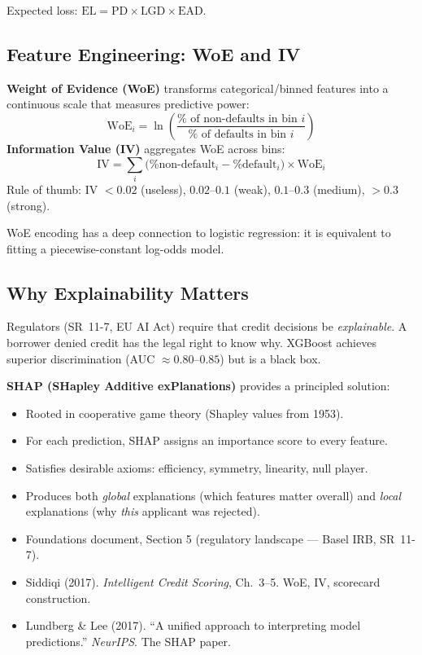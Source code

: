 \documentclass[11pt, a4paper]{article}
\begin{document}
Expected loss: $\text{EL} = \text{PD} \times \text{LGD} \times \text{EAD}$.

\subsection{Feature Engineering: WoE and IV}

\begin{keyidea}
\textbf{Weight of Evidence (WoE)} transforms categorical/binned features into a continuous scale that measures predictive power:
\[
    \text{WoE}_i = \ln\!\left(\frac{\% \text{ of non-defaults in bin } i}{\% \text{ of defaults in bin } i}\right)
\]
\textbf{Information Value (IV)} aggregates WoE across bins:
\[
    \text{IV} = \sum_i \bigl(\%\text{non-default}_i - \%\text{default}_i\bigr) \times \text{WoE}_i
\]
Rule of thumb: IV $< 0.02$ (useless), $0.02$--$0.1$ (weak), $0.1$--$0.3$ (medium), $> 0.3$ (strong).

WoE encoding has a deep connection to logistic regression: it is equivalent to fitting a piecewise-constant log-odds model.
\end{keyidea}

\subsection{Why Explainability Matters}

Regulators (SR~11-7, EU AI Act) require that credit decisions be \emph{explainable}.
A borrower denied credit has the legal right to know why.
XGBoost achieves superior discrimination (AUC $\approx 0.80$--$0.85$) but is a black box.

\textbf{SHAP (SHapley Additive exPlanations)} provides a principled solution:
\begin{itemize}
    \item Rooted in cooperative game theory (Shapley values from 1953).
    \item For each prediction, SHAP assigns an importance score to every feature.
    \item Satisfies desirable axioms: efficiency, symmetry, linearity, null player.
    \item Produces both \emph{global} explanations (which features matter overall) and \emph{local} explanations (why \emph{this} applicant was rejected).
\end{itemize}

\begin{prereq}
\begin{itemize}
    \item Foundations document, Section 5 (regulatory landscape --- Basel IRB, SR~11-7).
    \item Siddiqi (2017). \emph{Intelligent Credit Scoring}, Ch.~3--5. WoE, IV, scorecard construction.
    \item Lundberg \& Lee (2017). ``A unified approach to interpreting model predictions.'' \emph{NeurIPS}. The SHAP paper.
\end{itemize}
\end{prereq}
\end{document}
